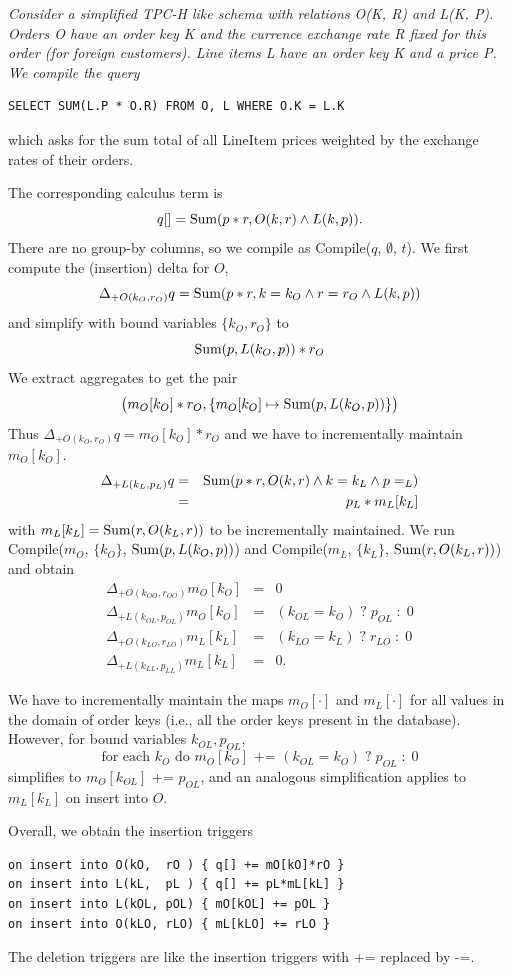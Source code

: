\begin{example}\em
Consider a simplified TPC-H like schema with relations O(K, R)
and L(K, P). Orders O have an order key K and the currence exchange rate R fixed for this order (for
foreign customers). Line items L have an {\em order} key
K and a price P. We compile the query
\begin{verbatim}
SELECT SUM(L.P * O.R) FROM O, L WHERE O.K = L.K
\end{verbatim}
which asks for the sum total of all LineItem prices weighted by the exchange
rates of their orders.

The corresponding calculus term is
\[
q[] = \mbox{Sum}(p*r, O(k, r) \land L(k, p)).
\]
There are no group-by columns, so we compile as Compile($q$, $\emptyset$, $t$).
We first compute the (insertion) delta for $O$,
\[
\Delta_{+O(k_{O}, r_{O})} q =
\mbox{Sum}(p*r, k=k_{O} \land r=r_{O} \land L(k, p))
\]
and simplify with bound variables $\{k_{O}, r_{O}\}$ to
\[
\mbox{Sum}(p, L(k_{O}, p))*r_{O}
\]
We extract aggregates to get the pair
\[
\big( m_O[k_{O}]*r_{O},
\{ m_O[k_{O}] \mapsto \mbox{Sum}(p, L(k_{O}, p)) \} \big)
\]
Thus $\Delta_{+O(k_{O}, r_{O})} q = m_O[k_{O}]*r_{O}$
and we have to incrementally maintain $m_O[k_O]$.
\begin{eqnarray*}
\Delta_{+L(k_{L}, p_{L})} q &=&
   \mbox{Sum}(p*r, O(k, r) \land k=k_{L} \land p=_{L}) \\
&=& p_{L} * m_L[k_{L}]
\end{eqnarray*}
with $m_L[k_{L}] = \mbox{Sum}(r, O(k_{L}, r))$ to be incrementally maintained.
We run Compile($m_O$, $\{k_{O}\}$, $\mbox{Sum}(p, L(k_{O}, p))$)
and Compile($m_L$, $\{k_{L}\}$, $\mbox{Sum}(r, O(k_{L}, r))$) and obtain
\begin{eqnarray*}
\Delta_{+O(k_{OO}, r_{OO})} m_O[k_O] &=& 0 \\
\Delta_{+L(k_{OL}, p_{OL})} m_O[k_O] &=& (k_{OL} = k_O) \;?\; p_{OL} \;:\; 0 \\
\Delta_{+O(k_{LO}, r_{LO})} m_L[k_L] &=& (k_{LO} = k_L) \;?\; r_{LO} \;:\; 0 \\
\Delta_{+L(k_{LL}, p_{LL})} m_L[k_L] &=& 0.
\end{eqnarray*}

We have to incrementally maintain the maps $m_O[\cdot]$ and
$m_L[\cdot]$ for all values in the domain of order keys (i.e., all the order
keys present in the database). However, for bound variables
$k_{OL}, p_{OL}$,
\[
\mbox{for each $k_O$ do $m_O[k_O]$ += $(k_{OL} = k_O) \;?\; p_{OL} \;:\; 0$}
\]
simplifies to $m_O[k_{OL}]$ += $p_{OL}$,
and an analogous simplification applies to $m_L[k_L]$ on insert into $O$.

Overall, we obtain the insertion triggers
\begin{verbatim}
on insert into O(kO,  rO ) { q[] += mO[kO]*rO }
on insert into L(kL,  pL ) { q[] += pL*mL[kL] }
on insert into L(kOL, pOL) { mO[kOL] += pOL }
on insert into O(kLO, rLO) { mL[kLO] += rLO }
\end{verbatim}
The deletion triggers are like the insertion triggers with += replaced by -=.
\punto
\end{example}


